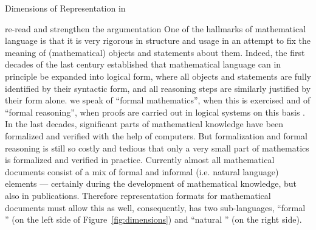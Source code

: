 \begin{omgroup}[id=syntax-semantics]{Dimensions of Representation in \omdoc}
\begin{newpart}{re-read and strengthen the argumentation}
One of the hallmarks of mathematical language is that it is very rigorous in structure and
usage in an attempt to fix the meaning of (mathematical) objects and statements about
them. Indeed, the first decades of the last century established that mathematical language
can in principle be expanded into logical form, where all objects and statements are fully
identified by their syntactic form, and all reasoning steps are similarly justified by
their form alone. we speak of ``formal mathematics'', when this is exercised and of
``formal reasoning'', when proofs are carried out in logical systems on this basis . In
the last decades, significant parts of mathematical knowledge have been formalized and
verified with the help of computers. But formalization and formal reasoning is still so
costly and tedious that only a very small part of mathematics is formalized and verified
in practice. Currently almost all mathematical documents consist of a mix of formal and
informal (i.e. natural language) elements --- certainly during the development of
mathematical knowledge, but also in publications. Therefore representation formats for
mathematical documents must allow this as well, consequently, \omdoc has two
sub-languages, ``formal \omdoc'' (on the left side of Figure~\ref{fig:dimensions}) and
``natural \omdoc'' (on the right side).


\end{newpart}
\end{omgroup}
